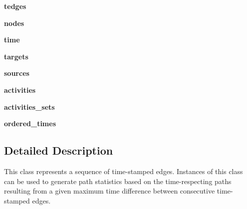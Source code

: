 \begin{DoxyCompactItemize}
\item 
\hypertarget{classpathpy_1_1TemporalNetwork_1_1TemporalNetwork_a2ed001aa13e863e9ff6ab9ffc9ab998d}{{\bfseries tedges}}\label{classpathpy_1_1TemporalNetwork_1_1TemporalNetwork_a2ed001aa13e863e9ff6ab9ffc9ab998d}

\item 
\hypertarget{classpathpy_1_1TemporalNetwork_1_1TemporalNetwork_a86e49baf6e63c58a3f993e2768097001}{{\bfseries nodes}}\label{classpathpy_1_1TemporalNetwork_1_1TemporalNetwork_a86e49baf6e63c58a3f993e2768097001}

\item 
\hypertarget{classpathpy_1_1TemporalNetwork_1_1TemporalNetwork_a1f61dbedd4a4edde5176fec56fc1f0b3}{{\bfseries time}}\label{classpathpy_1_1TemporalNetwork_1_1TemporalNetwork_a1f61dbedd4a4edde5176fec56fc1f0b3}

\item 
\hypertarget{classpathpy_1_1TemporalNetwork_1_1TemporalNetwork_ae82b4df377620a626771cdcdcbb43b42}{{\bfseries targets}}\label{classpathpy_1_1TemporalNetwork_1_1TemporalNetwork_ae82b4df377620a626771cdcdcbb43b42}

\item 
\hypertarget{classpathpy_1_1TemporalNetwork_1_1TemporalNetwork_a0716456e27f19af5522af30e071df0ff}{{\bfseries sources}}\label{classpathpy_1_1TemporalNetwork_1_1TemporalNetwork_a0716456e27f19af5522af30e071df0ff}

\item 
\hypertarget{classpathpy_1_1TemporalNetwork_1_1TemporalNetwork_ae9ea417aa751edb7e58bc1c23602b9b8}{{\bfseries activities}}\label{classpathpy_1_1TemporalNetwork_1_1TemporalNetwork_ae9ea417aa751edb7e58bc1c23602b9b8}

\item 
\hypertarget{classpathpy_1_1TemporalNetwork_1_1TemporalNetwork_a65a5f24cb5e6cf06960f8c93c6c8aa84}{{\bfseries activities\-\_\-sets}}\label{classpathpy_1_1TemporalNetwork_1_1TemporalNetwork_a65a5f24cb5e6cf06960f8c93c6c8aa84}

\item 
\hypertarget{classpathpy_1_1TemporalNetwork_1_1TemporalNetwork_a051e7d352da3d194387762134bd70992}{{\bfseries ordered\-\_\-times}}\label{classpathpy_1_1TemporalNetwork_1_1TemporalNetwork_a051e7d352da3d194387762134bd70992}

\end{DoxyCompactItemize}


\subsection{Detailed Description}
\begin{DoxyVerb}This class represents a sequence of time-stamped edges.
   Instances of this class can be used to generate path statistics 
   based on the time-respecting paths resulting from a given maximum
   time difference between consecutive time-stamped edges.
\end{DoxyVerb}
 

